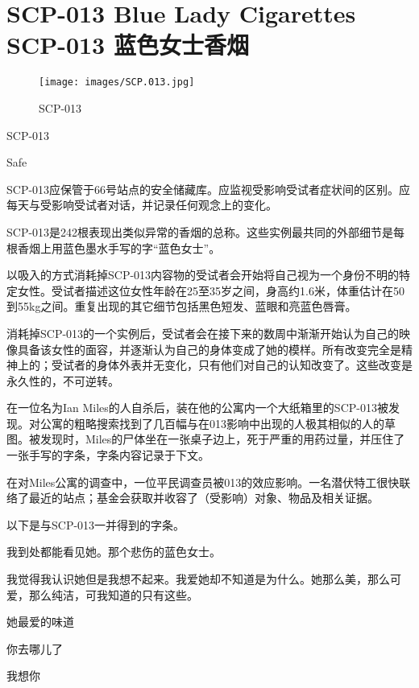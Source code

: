 \chapter[SCP-013 蓝色女士香烟]{
    SCP-013 Blue Lady Cigarettes\\
    SCP-013 蓝色女士香烟
}

\label{chap:SCP-013}

\begin{figure}[H]
    \centering
    \texttt{[image: images/SCP.013.jpg]}
    \caption*{SCP-013}
\end{figure}

SCP-013

Safe

SCP-013应保管于66号站点的安全储藏库。应监视受影响受试者症状间的区别。应每天与受影响受试者对话，并记录任何观念上的变化。

SCP-013是242根表现出类似异常的香烟的总称。这些实例最共同的外部细节是每根香烟上用蓝色墨水手写的字“蓝色女士”。

以吸入的方式消耗掉SCP-013内容物的受试者会开始将自己视为一个身份不明的特定女性。受试者描述这位女性年龄在25至35岁之间，身高约1.6米，体重估计在50到55kg之间。重复出现的其它细节包括黑色短发、蓝眼和亮蓝色唇膏。

消耗掉SCP-013的一个实例后，受试者会在接下来的数周中渐渐开始认为自己的映像具备该女性的面容，并逐渐认为自己的身体变成了她的模样。所有改变完全是精神上的；受试者的身体外表并无变化，只有他们对自己的认知改变了。这些改变是永久性的，不可逆转。

在一位名为Ian Miles的人自杀后，装在他的公寓内一个大纸箱里的SCP-013被发现。对公寓的粗略搜索找到了几百幅与在013影响中出现的人极其相似的人的草图。被发现时，Miles的尸体坐在一张桌子边上，死于严重的用药过量，并压住了一张手写的字条，字条内容记录于下文。

在对Miles公寓的调查中，一位平民调查员被013的效应影响。一名潜伏特工很快联络了最近的站点；基金会获取并收容了（受影响）对象、物品及相关证据。

以下是与SCP-013一并得到的字条。

\begin{scpbox}

我到处都能看见她。那个悲伤的蓝色女士。

我觉得我认识她但是我想不起来。我爱她却不知道是为什么。她那么美，那么可爱，那么纯洁，可我知道的只有这些。

她最爱的味道

你去哪儿了

我想你

\end{scpbox}

